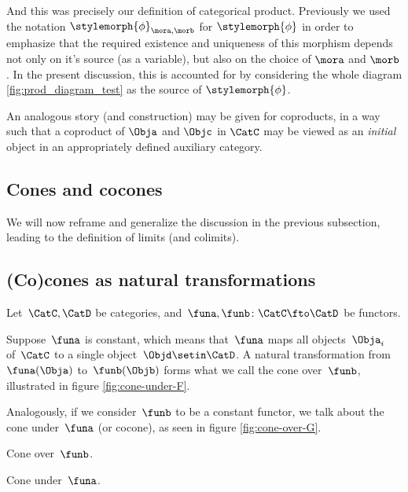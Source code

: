 And this was precisely our definition of categorical product. Previously we used the notation $\stylemorph{\phi}_{\mora, \morb}$ for $\stylemorph{\phi}$ in order to emphasize that the required existence and uniqueness of this morphism depends not only on it's source (as a variable), but also on the choice of $\mora$ and $\morb$. In the present discussion, this is accounted for by considering the whole diagram \cref{fig:prod_diagram_test} as the source of $\stylemorph{\phi}$. 

\begin{remark}
An analogous story (and construction) may be given for coproducts, in a way such that a coproduct of $\Obja$ and $\Objc$ in $\CatC$ may be viewed as an \emph{initial} object in an appropriately defined auxiliary category. 
\end{remark}

\subsection{Cones and cocones}

We will now reframe and generalize the discussion in the previous subsection, leading to the definition of limits (and colimits). 



\subsection{(Co)cones as natural transformations} 

    Let~$\CatC, \CatD$ be categories, and~$\funa, \funb\colon\CatC\fto\CatD$ be functors. 
    
    Suppose~$\funa$ is constant, which means that~$\funa$ maps all objects~$\Obja_i$ of~$\CatC$ to a single object~$\Objd \setin \CatD$.
    A natural transformation from~$\funa(\Obja)$ to~$\funb(\Objb)$ forms what we call the cone over~$\funb$, illustrated in figure \cref{fig:cone-under-F}.
    
    Analogously, if we consider~$\funb$ to be a constant functor, we talk about the cone under~$\funa$ (or cocone), as seen in figure \cref{fig:cone-over-G}.



\begin{marginfigure}
    \centering
    \caption{Cone over~$\funb$.
    }
    \label{fig:cone-over-G}
\end{marginfigure}

\begin{marginfigure}
    \centering
    \label{fig:cone-under-F}
    \caption{Cone under~$\funa$.}
\end{marginfigure}


